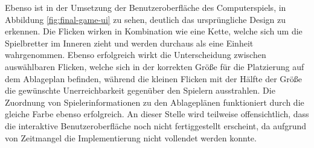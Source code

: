 Ebenso ist in der Umsetzung der Benutzeroberfläche des Computerspiels, in Abbildung \ref{fig:final-game-ui} zu sehen, deutlich das ursprüngliche Design zu erkennen. Die Flicken wirken in Kombination wie eine Kette, welche sich um die Spielbretter im Inneren zieht und werden durchaus als eine Einheit wahrgenommen. Ebenso erfolgreich wirkt die Unterscheidung zwischen auswählbaren Flicken, welche sich in der korrekten Größe für die Platzierung auf dem Ablageplan befinden, während die kleinen Flicken mit der Hälfte der Größe die gewünschte Unerreichbarkeit gegenüber den Spielern ausstrahlen. Die Zuordnung von Spielerinformationen zu den Ablageplänen funktioniert durch die gleiche Farbe ebenso erfolgreich. An dieser Stelle wird teilweise offensichtlich, dass die interaktive Benutzeroberfläche noch nicht fertiggestellt erscheint, da aufgrund von Zeitmangel die Implementierung nicht vollendet werden konnte.